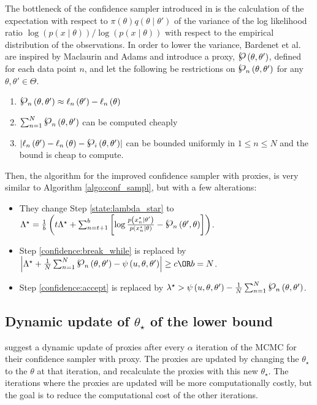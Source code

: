 {The bottleneck of the confidence sampler introduced in \cite{Bardenet:2} is the calculation of the expectation with respect to $\pi\left(\theta\right)q\left(\theta \mid \theta'\right)$ of the variance of the log likelihood ratio $\log \left(p\left(x\mid \theta\right)\right) / \log \left(p\left(x\mid \theta\right)\right)$ with respect to the empirical distribution of the observations.
In order to lower the variance, Bardenet et al. are inspired by Maclaurin and Adams and introduce a proxy, $\powerset\left(\theta, \theta'\right)$, defined for each data point $n$, and let the following be restrictions on $\powerset_n\left(\theta, \theta'\right)$ for any $\theta, \theta' \in \Theta$. 
\begin{enumerate}
    \item $\powerset_n\left(\theta, \theta'\right) \approx \ell_n\left(\theta'\right) - \ell_n\left(\theta\right)$
    \item $ \sum_{n = 1}^N \powerset_n\left(\theta, \theta'\right)$ can be computed cheaply
    \item $\left| \ell_n\left(\theta'\right) - \ell_n\left(\theta\right) - \powerset_i\left(\theta, \theta'\right)\right|$ can be bounded uniformly in $1\leq n \leq N$ and the bound is cheap to compute. 
\end{enumerate}
Then, the algorithm for the improved confidence sampler with proxies, is very similar to Algorithm \ref{algo:conf_sampl}, but with a few alterations:
\begin{itemize}
    \item They change Step \ref{state:lambda_star} to $\Lambda^{\star} = \frac{1}{b} \left(t \Lambda^{\star} + \sum_{n = t+1} ^b \left[ \log\frac{p\left(x_n^{\star}\mid \theta'\right)}{p\left(x_n^{\star}\mid\theta\right) } - \powerset_n\left(\theta', \theta\right) \right]\right)$.
    \item Step \ref{confidence:break_while} is replaced by $\left|\Lambda^{\star} + \frac{1}{N} \sum_{n=1}^N \powerset_n \left(\theta, \theta'\right) - \psi\left(u, \theta,\theta'\right)\right| \geq c \OR b = N$.
    \item Step \ref{confidence:accept} is replaced by $\lambda^{\star} > \psi\left(u, \theta, \theta'\right) - \frac{1}{N} \sum_{n=1}^N \powerset_n\left(\theta, \theta'\right) $. 
\end{itemize}


\subsection{Dynamic update of $\theta_{\star}$ of the lower bound}
\cite{Bardenet:1} suggest a dynamic update of proxies after every $\alpha$ iteration of the MCMC for their confidence sampler with proxy. The proxies are updated by changing the $\theta_{\star}$ to the $\theta$ at that iteration, and recalculate the proxies with this new $\theta_{\star}$. The iterations where the proxies are updated will be more computationally costly, but the goal is to reduce the computational cost of the other iterations.


}
